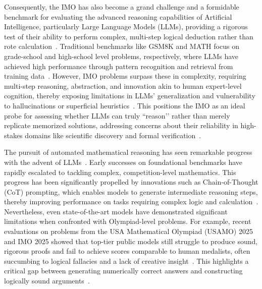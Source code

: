 Consequently, the IMO has also become a grand challenge and a formidable benchmark for evaluating the advanced reasoning capabilities of Artificial Intelligence, particularly Large Language Models (LLMs), providing a rigorous test of their ability to perform complex, multi-step logical deduction rather than rote calculation~\cite{he2024olympiadbench, trinh2024solving, matharena2025}. Traditional benchmarks like GSM8K and MATH focus on grade-school and high-school level problems, respectively, where LLMs have achieved high performance through pattern recognition and retrieval from training data~\cite{cobbe2021gsm8k,hendrycks2021math}. However, IMO problems surpass these in complexity, requiring multi-step reasoning, abstraction, and innovation akin to human expert-level cognition, thereby exposing limitations in LLMs’ generalization and vulnerability to hallucinations or superficial heuristics~\cite{frontiermath2024}. This positions the IMO as an ideal probe for assessing whether LLMs can truly ``reason’’ rather than merely replicate memorized solutions, addressing concerns about their reliability in high-stakes domains like scientific discovery and formal verification~\cite{li2025advocate}.

The pursuit of automated mathematical reasoning has seen remarkable progress with the advent of LLMs~\cite{ahn2024large, wang2025survey}. Early successes on foundational benchmarks have rapidly escalated to tackling complex, competition-level mathematics. This progress has been significantly propelled by innovations such as Chain-of-Thought (CoT) prompting, which enables models to generate intermediate reasoning steps, thereby improving performance on tasks requiring complex logic and calculation~\cite{wei2022chain}. Nevertheless, even state-of-the-art models have demonstrated significant limitations when confronted with Olympiad-level problems. For example, recent evaluations on problems from the USA Mathematical Olympiad (USAMO) 2025 and IMO 2025 showed that top-tier public models still struggle to produce sound, rigorous proofs and fail to achieve scores comparable to human medalists, often succumbing to logical fallacies and a lack of creative insight~\cite{petrov2025proof, matharena2025}. This highlights a critical gap between generating numerically correct answers and constructing logically sound arguments~\cite{mahdavi2025brains}.

